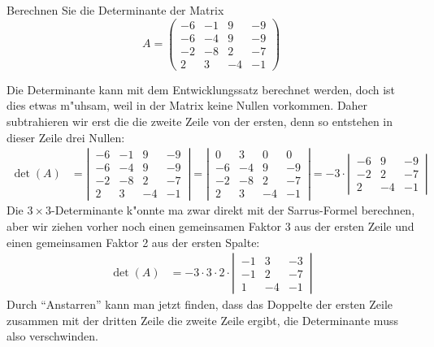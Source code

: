 Berechnen Sie die Determinante der Matrix
\[
A=\begin{pmatrix}
-6&-1& 9&-9\\
-6&-4& 9&-9\\
-2&-8& 2&-7\\
 2& 3&-4&-1
\end{pmatrix}
\]

\begin{loesung}
Die Determinante kann mit dem Entwicklungssatz berechnet werden, doch
ist dies etwas m"uhsam, weil in der Matrix keine Nullen vorkommen.
Daher subtrahieren wir erst die die zweite Zeile von der ersten, denn
so entstehen in dieser Zeile drei Nullen:
\begin{align*}
\det(A)
&=
\left|\,\begin{matrix}
-6&-1& 9&-9\\
-6&-4& 9&-9\\
-2&-8& 2&-7\\
 2& 3&-4&-1
\end{matrix}\,\right|
=
\left|\,\begin{matrix}
 0& 3& 0& 0\\
-6&-4& 9&-9\\
-2&-8& 2&-7\\
 2& 3&-4&-1
\end{matrix}\,\right|
=
-3\cdot\left|\,\begin{matrix}
-6& 9&-9\\
-2& 2&-7\\
 2&-4&-1
\end{matrix}\,\right|
\end{align*}
Die $3\times 3$-Determinante k"onnte ma zwar direkt mit der
Sarrus-Formel berechnen, aber wir ziehen vorher noch einen gemeinsamen
Faktor 3 aus der ersten Zeile und einen gemeinsamen Faktor 2 aus der
ersten Spalte:
\begin{align}
\det(A)
&=
-3\cdot 3\cdot 2\cdot\left|\,\begin{matrix}
-1& 3&-3\\
-1& 2&-7\\
 1&-4&-1
\end{matrix}\,\right|
\label{20000037:3det}
\end{align}
Durch ``Anstarren'' kann man jetzt finden, dass das Doppelte der ersten
Zeile zusammen mit der dritten Zeile die zweite Zeile ergibt, die Determinante
muss also verschwinden.


\end{loesung}
